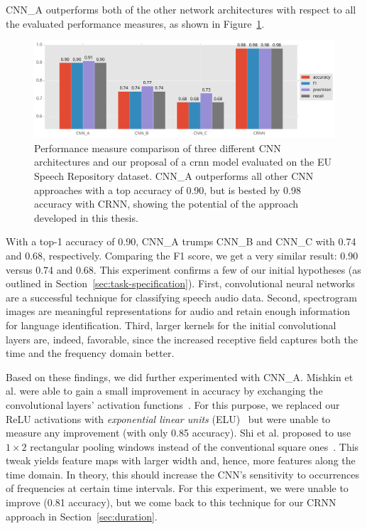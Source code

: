 CNN\_A outperforms both of the other network architectures with respect to all the evaluated performance measures, as shown in Figure~\ref{fig:eu_results}.
%
	\begin{figure}[tp]
  		\centering
    	\includegraphics[width=\textwidth, keepaspectratio]{plots/results_eu_plot.pdf}
    	\caption{Performance measure comparison of three different CNN architectures and our proposal of a \ac{crnn} model evaluated on the EU Speech Repository dataset. CNN\_A outperforms all other CNN approaches with a top accuracy of \num{0.90}, but is bested by \num{0.98} accuracy with CRNN, showing the potential of the approach developed in this thesis.}
    	\label{fig:eu_results}
	\end{figure}
%
With a top-1 accuracy of \num{0.90}, CNN\_A trumps CNN\_B and CNN\_C with \num{0.74} and \num{0.68}, respectively. Comparing the F1 score, we get a very similar result: \num{0.90} versus \num{0.74} and \num{0.68}. This experiment confirms a few of our initial hypotheses (as outlined in Section~\ref{sec:task-specification}). First, convolutional neural networks are a successful technique for classifying speech audio data. Second, spectrogram images are meaningful representations for audio and retain enough information for language identification. Third, larger kernels for the initial convolutional layers are, indeed, favorable, since the increased receptive field captures both the time and the frequency domain better.

Based on these findings, we did further experimented with CNN\_A. Mishkin et al. were able to gain a small improvement in accuracy by exchanging the convolutional layers' activation functions~\cite{mishkin2016systematic}. For this purpose, we replaced our ReLU activations with \emph{exponential linear units} (ELU)~\cite{clevert2015fast} but were unable to measure any improvement (with only \num{0.85} accuracy).
Shi et al. proposed to use $1 \times 2$ rectangular pooling windows instead of the conventional square ones~\cite{shi2016end}. This tweak yields feature maps with larger width and, hence, more features along the time domain. In theory, this should increase the CNN's sensitivity to occurrences of frequencies at certain time intervals. For this experiment, we were unable to improve (\num{0.81} accuracy), but we come back to this technique for our CRNN approach in Section~\ref{sec:duration}.

